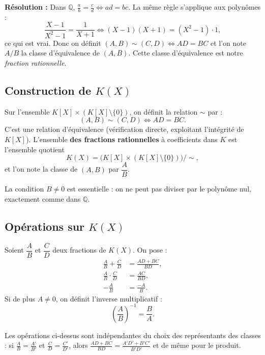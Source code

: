 \textbf{Résolution :} Dans $\mathbb{Q}$, $\frac{a}{b} = \frac{c}{d} \iff ad = bc$. La même règle s'applique aux polynômes :
\[ \frac{X - 1}{X^2 - 1} = \frac{1}{X + 1} \iff (X - 1)(X + 1) = (X^2 - 1) \cdot 1, \]
ce qui est vrai. Donc on définit $(A, B) \sim (C, D) \iff AD = BC$ et l'on note $A/B$ la classe d'équivalence de $(A, B)$. Cette classe d'équivalence est notre \emph{fraction rationnelle}.

\subsection{Construction de $K(X)$}

\begin{definition}
Sur l'ensemble $K[X] \times (K[X] \setminus \{0\})$, on définit la relation $\sim$ par :
\[ (A, B) \sim (C, D) \iff AD = BC. \]
C'est une relation d'équivalence (vérification directe, exploitant l'intégrité de $K[X]$).
L'ensemble \textbf{des fractions rationnelles} à coefficients dans $K$ est l'ensemble quotient
\[ K(X) = \big( K[X] \times (K[X] \setminus \{0\}) \big) \big/ \sim, \]
et l'on note la classe de $(A, B)$ par $\dfrac{A}{B}$.
\end{definition}

\begin{remarque}
La condition $B \neq 0$ est essentielle : on ne peut pas diviser par le polynôme nul, exactement comme dans $\mathbb{Q}$.
\end{remarque}

\subsection{Opérations sur $K(X)$}

\begin{definition}
Soient $\dfrac{A}{B}$ et $\dfrac{C}{D}$ deux fractions de $K(X)$. On pose :
\begin{align*}
\frac{A}{B} + \frac{C}{D} &= \frac{AD + BC}{BD}, \\
\frac{A}{B} \cdot \frac{C}{D} &= \frac{AC}{BD}, \\
-\frac{A}{B} &= \frac{-A}{B}.
\end{align*}
Si de plus $A \neq 0$, on définit l'inverse multiplicatif :
\[ \left(\frac{A}{B}\right)^{-1} = \frac{B}{A}. \]
\end{definition}

\begin{proposition}
Les opérations ci-dessus sont indépendantes du choix des représentants des classes : si $\frac{A}{B} = \frac{A'}{B'}$ et $\frac{C}{D} = \frac{C'}{D'}$, alors $\frac{AD + BC}{BD} = \frac{A'D' + B'C'}{B'D'}$ et de même pour le produit.
\end{proposition}

